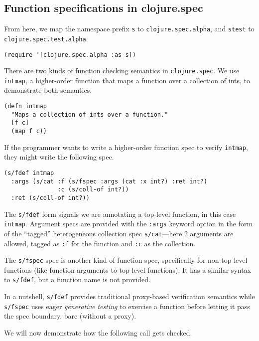 \subsection{Function specifications in clojure.spec}

From here, we map the namespace prefix \texttt{s} to \texttt{clojure.spec.alpha},
and \texttt{stest} to \texttt{clojure.spec.test.alpha}.

\begin{verbatim}
(require '[clojure.spec.alpha :as s])
\end{verbatim}

There are two kinds of function checking semantics in \texttt{clojure.spec}.
We use \texttt{intmap}, a higher-order function that maps a function over 
a collection of ints, to demonstrate both semantics.

\begin{verbatim}
(defn intmap
  "Maps a collection of ints over a function."
  [f c]
  (map f c))
\end{verbatim}

If the programmer wants to write a higher-order function spec to
verify \texttt{intmap}, they might write the following spec.

\begin{verbatim}
(s/fdef intmap
  :args (s/cat :f (s/fspec :args (cat :x int?) :ret int?)
               :c (s/coll-of int?))
  :ret (s/coll-of int?))
\end{verbatim}

The \texttt{s/fdef} form signals we are annotating a top-level
function, in this case \texttt{intmap}. Argument specs are
provided with the \texttt{:args} keyword option
in the form of the ``tagged'' heterogeneous collection spec
\texttt{s/cat}---here 2 arguments are allowed, tagged as
\texttt{:f} for the function and \texttt{:c} as the collection.

The \texttt{s/fspec} spec is another kind of function spec,
specifically for non-top-level functions (like function arguments
to top-level functions). It has a similar syntax to \texttt{s/fdef},
but a function name is not provided.

In a nutshell, \texttt{s/fdef} provides traditional proxy-based
verification semantics while \texttt{s/fspec} uses eager \emph{generative testing}
to exercise a function before letting it pass the spec boundary, bare (without a proxy).

We will now demonstrate how the following call gets checked.


